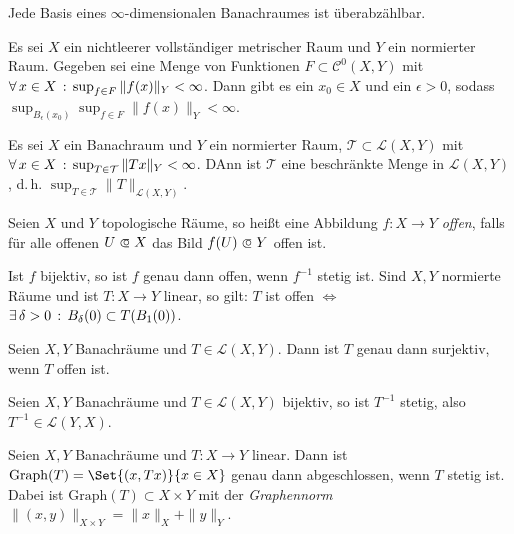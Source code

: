\documentclass{cheat-sheet}
\newcommand{\Leb}{\mathcal{L}} %
\begin{document}
\begin{kor}
  Jede Basis eines $\infty$-dimensionalen Banachraumes ist überabzählbar.
\end{kor}

\begin{satz}
  Es sei $X$ ein nichtleerer vollständiger metrischer Raum und $Y$ ein normierter Raum. Gegeben sei eine Menge von Funktionen $F \subset \mathcal{C}^0(X, Y)$ mit $\forall \, {x \in X} \,:\, \sup_{f \in F} \|f(x)\|_Y < \infty$. Dann gibt es ein $x_0 \in X$ und ein $\epsilon > 0$, sodass $\sup_{B_\epsilon(x_0)} \sup_{f \in F} \|f(x)\|_Y < \infty$.
\end{satz}

\begin{satz}
  Es sei $X$ ein Banachraum und $Y$ ein normierter Raum, $\mathcal{T} \subset \Leb(X, Y)$ mit $\forall \, {x \in X} \,:\, \sup_{T \in \mathcal{T}} \|Tx\|_Y < \infty$. DAnn ist $\mathcal{T}$ eine beschränkte Menge in $\Leb(X, Y)$, d.\,h. $\sup_{T \in \mathcal{T}} \|T\|_{\mathcal{L}(X, Y)}$.
\end{satz}

\begin{defn}
  Seien $X$ und $Y$ topologische Räume, so heißt eine Abbildung $f : X \to Y$ \emph{offen}, falls für alle offenen $U \opn X$ das Bild $f(U) \opn Y$ offen ist.
\end{defn}

\begin{bem}
  Ist $f$ bijektiv, so ist $f$ genau dann offen, wenn $f^{-1}$ stetig ist. Sind $X, Y$ normierte Räume und ist $T : X \to Y$ linear, so gilt: $T$ ist offen $\iff$ $\exists \, {\delta > 0} \,:\, B_{\delta}(0) \subset T(B_1(0))$.
\end{bem}

\begin{satz}
  Seien $X, Y$ Banachräume und $T \in \mathcal{L}(X, Y)$. Dann ist $T$ genau dann surjektiv, wenn $T$ offen ist.
\end{satz}

\begin{satz}
  Seien $X, Y$ Banachräume und $T \in \mathcal{L}(X, Y)$ bijektiv, so ist $T^{-1}$ stetig, also $T^{-1} \in \mathcal{L}(Y, X)$.
\end{satz}

\begin{satz}
  Seien $X, Y$ Banachräume und $T : X \to Y$ linear. Dann ist $\mathrm{Graph}(T) = \Set{ (x, Tx) }{ x \in X }$ genau dann abgeschlossen, wenn $T$ stetig ist. Dabei ist $\mathrm{Graph}(T) \subset X \times Y$ mit der \emph{Graphennorm} $\|(x,y)\|_{X \times Y} = \|x\|_X + \|y\|_Y$.
\end{satz}
\end{document}
